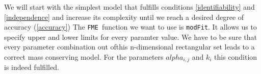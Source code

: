 \documentclass[a4paper]{article}\usepackage[]{graphicx}\usepackage[]{color}
\newcommand{\SoilR}{\texttt{SoilR }}
\newcommand{\FME}{\texttt{FME }}
\begin{document}
We will start with the simplest model that fulfills conditions \ref{identifiability} and \ref{independence} and increase its complexity until we reach a desired degree of accuracy (\ref{accuracy})
%
The \FME function we want to use is {\tt modFit}.
It allows us to specify upper and lower limits for every paramter value. 
We have to be sure that every parameter combination out ofthis n-dimensional rectangular set leads to a correct mass conserving model.
For the parameters $alpha_{i,j}$ and $k_{i}$ this condition is indeed fulfilled.
\end{document}
